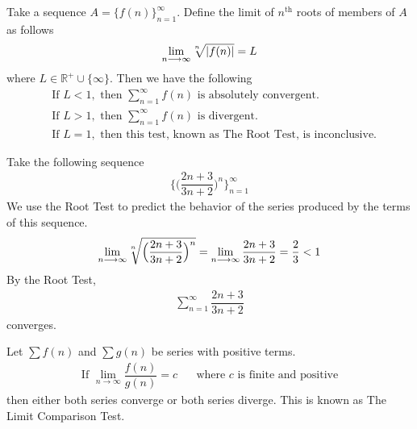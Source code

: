 \begin{theorem}
Take a sequence $A = \{f(n)\}_{n = 1}^{\infty}$. Define the limit of $n^{\text{th}}$ roots of members of $A$ as follows
\begin{align*}
    \lim_{n \longrightarrow \infty} \sqrt[\leftroot{2}\uproot{2}n]{\lvert f(n) \rvert} = L
\end{align*}
where $L \in \mathbb{R^{+}} \cup \{\infty\}$. Then we have the following
\begin{align*}
    &\text{If} \hspace{4pt} L < 1, \hspace{4pt} \text{then} \hspace{4pt} \sum_{n = 1}^{\infty} f(n) \hspace{4pt} \text{is absolutely convergent.}\\[2ex]
    &\text{If} \hspace{4pt} L > 1, \hspace{4pt} \text{then} \hspace{4pt} \sum_{n = 1}^{\infty} f(n) \hspace{4pt} \text{is divergent.}\\[2ex]
    &\text{If} \hspace{4pt} L = 1, \hspace{4pt} \text{then this test, known as The Root Test, is inconclusive.}
\end{align*}
\end{theorem}

\begin{example}
Take the following sequence
\begin{align*}
    \Big\{\Big(\dfrac{2n+3}{3n+2}\Big)^{n}\Big\}_{n=1}^{\infty}
\end{align*}
We use the Root Test to predict the behavior of the series produced by the terms of this sequence.
\begin{align*}
    \lim_{n \longrightarrow \infty} \sqrt[\leftroot{2}\uproot{2}n]{\Big(\dfrac{2n+3}{3n+2}\Big)^{n}} = \lim_{n \longrightarrow \infty} \dfrac{2n+3}{3n+2} = \dfrac{2}{3} < 1
\end{align*}
By the Root Test, 
\begin{align*}
\sum_{n=1}^{\infty} \dfrac{2n+3}{3n+2}
\end{align*}
converges.
\end{example}

\begin{theorem}
Let $\sum f(n)$ and $\sum g(n)$ be series with positive terms. 
\begin{align*}
    \text{If} \hspace{4pt} \lim_{n \longrightarrow \infty} \dfrac{f(n)}{g(n)} = c \hspace{20pt} \text{where} \hspace{4pt} c \hspace{4pt} \text{is finite and positive} 
\end{align*}
then either both series converge or both series diverge. This is known as The Limit Comparison Test.
\end{theorem}

